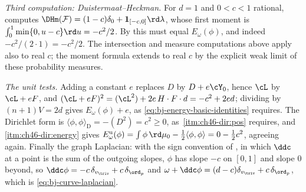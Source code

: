 \begin{example}
\emph{Third computation: Duistermaat--Heckman.}  For $d=1$ and
$0<c<1$ rational,  computes
$\DHm(\mathcal F)=(1-c)\delta_0+\mathbf 1_{[-c,0]}\rd\lambda$, whose
first moment is
$\int_0^1\min\{0,u-c\}\rd u=-c^2/2$.  By
 this must equal $E_\omega(\phi)$, and indeed
$-c^2/(2\cdot1)=-c^2/2$. The intersection and measure computations
above apply also to real $c$; the moment formula extends to real $c$
by the explicit weak limit of these probability measures.

\emph{The unit tests.}  Adding a constant $e$ replaces $D$ by
$D+e\cY_0$, hence $\cL$ by $\cL+eF$, and
$(\cL+eF)^2=(\cL^2)+2e\,H\cdot F\cdot d=-c^2+2ed$; dividing by
$(n+1)V=2d$ gives $E_\omega(\phi)+e$, as
\eqref{eq:bj-energy-basic-identities} requires.  The Dirichlet form is
$\langle\phi,\phi\rangle_{\mathrm D}=-(D^2)=c^2\ge0$, as
\,\cref{itm:ch46-dir:pos} requires, and
\,\cref{itm:ch46-dir:energy} gives
$E^{\mathrm u}_\omega(\phi)=\int\phi\,\rd\mu_0-\tfrac12\langle\phi,\phi\rangle
=0-\tfrac12c^2$, agreeing again.  Finally the graph Laplacian: with the
sign convention of , in which $\ddc$ at a
point is the sum of the outgoing slopes, $\phi$ has slope $-c$ on
$[0,1]$ and slope $0$ beyond, so
$\ddc\phi=-c\,\delta_{v_{\triv}}+c\,\delta_{\ord_p}$ and
$\omega+\ddc\phi=(d-c)\delta_{v_{\triv}}+c\,\delta_{\ord_p}$, which is
\eqref{eq:bj-curve-laplacian}.
\end{example}

